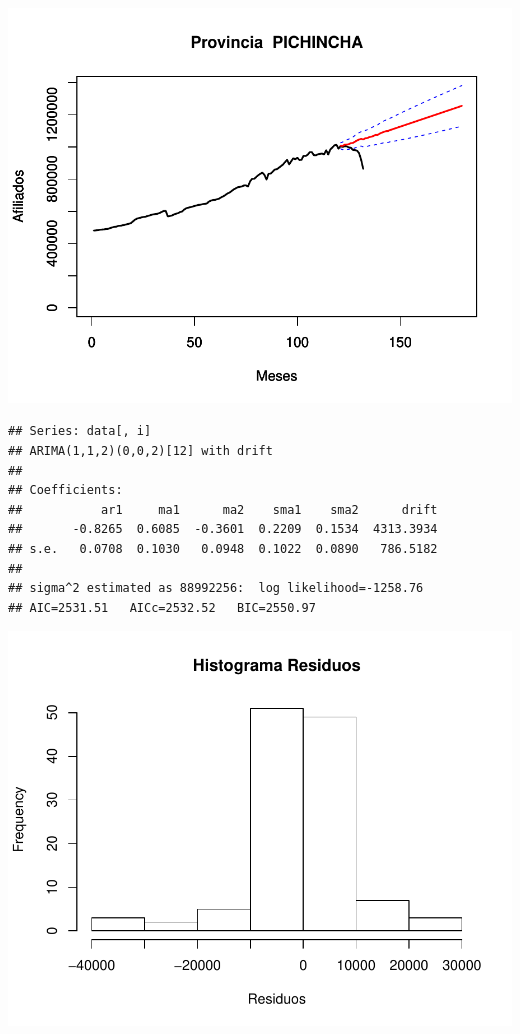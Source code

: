 \documentclass[11pt,a4paper,oneside]{article}\usepackage[]{graphicx}\usepackage[]{color}
\makeatletter
\def\maxwidth{ %
  \ifdim\Gin@nat@width>\linewidth
    \linewidth
  \else
    \Gin@nat@width
  \fi
}
\newenvironment{kframe}{%
 \def\at@end@of@kframe{}%
 \ifinner\ifhmode%
  \def\at@end@of@kframe{\end{minipage}}%
  \begin{minipage}{\columnwidth}%
 \fi\fi%
 \def\FrameCommand##1{\hskip\@totalleftmargin \hskip-\fboxsep
 \colorbox{shadecolor}{##1}\hskip-\fboxsep
     \hskip-\linewidth \hskip-\@totalleftmargin \hskip\columnwidth}%
 \MakeFramed {\advance\hsize-\width
   \@totalleftmargin\z@ \linewidth\hsize
   \@setminipage}}%
 {\par\unskip\endMakeFramed%
 \at@end@of@kframe}
\newenvironment{knitrout}{}{} %
\makeatother
\begin{document}
\begin{knitrout}
{\centering \includegraphics[width=\maxwidth]{figure/unnamed-chunk-16-55} 

}


\begin{kframe}\begin{verbatim}
## Series: data[, i] 
## ARIMA(1,1,2)(0,0,2)[12] with drift         
## 
## Coefficients:
##           ar1     ma1      ma2    sma1    sma2      drift
##       -0.8265  0.6085  -0.3601  0.2209  0.1534  4313.3934
## s.e.   0.0708  0.1030   0.0948  0.1022  0.0890   786.5182
## 
## sigma^2 estimated as 88992256:  log likelihood=-1258.76
## AIC=2531.51   AICc=2532.52   BIC=2550.97
\end{verbatim}
\end{kframe}

{\centering \includegraphics[width=\maxwidth]{figure/unnamed-chunk-16-56} 

}
\end{knitrout}
\end{document}
